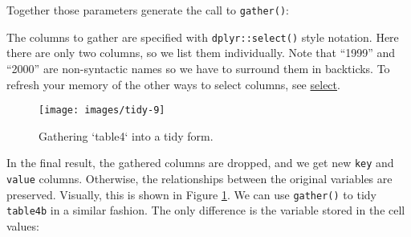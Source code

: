 \documentclass[]{book}
\newenvironment{Shaded}{\begin{snugshade}}{\end{snugshade}}
\newcommand{\KeywordTok}[1]{\textcolor[rgb]{0.13,0.29,0.53}{\textbf{{#1}}}}
\newcommand{\DataTypeTok}[1]{\textcolor[rgb]{0.13,0.29,0.53}{{#1}}}
\newcommand{\StringTok}[1]{\textcolor[rgb]{0.31,0.60,0.02}{{#1}}}
\newcommand{\CommentTok}[1]{\textcolor[rgb]{0.56,0.35,0.01}{\textit{{#1}}}}
\newcommand{\NormalTok}[1]{{#1}}
\begin{document}
Together those parameters generate the call to \texttt{gather()}:

\begin{Shaded}
\end{Shaded}

The columns to gather are specified with \texttt{dplyr::select()} style
notation. Here there are only two columns, so we list them individually.
Note that ``1999'' and ``2000'' are non-syntactic names so we have to
surround them in backticks. To refresh your memory of the other ways to
select columns, see \protect\hyperlink{select}{select}.

\begin{figure}

{\centering \texttt{[image: images/tidy-9]} 

}

\caption{Gathering `table4` into a tidy form.}\label{fig:tidy-gather}
\end{figure}

In the final result, the gathered columns are dropped, and we get new
\texttt{key} and \texttt{value} columns. Otherwise, the relationships
between the original variables are preserved. Visually, this is shown in
Figure \ref{fig:tidy-gather}. We can use \texttt{gather()} to tidy
\texttt{table4b} in a similar fashion. The only difference is the
variable stored in the cell values:

\begin{Shaded}
\end{Shaded}
\end{document}
